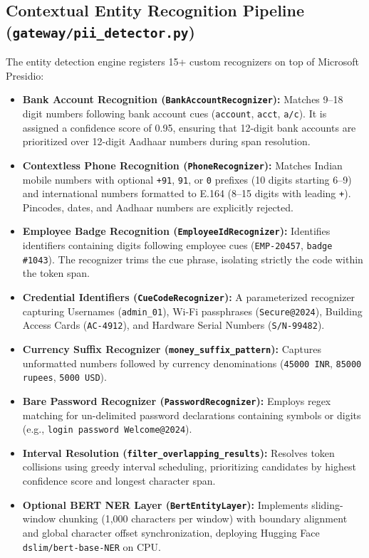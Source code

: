 \subsection{Contextual Entity Recognition Pipeline (\texttt{gateway/pii\_detector.py})}
The entity detection engine registers 15+ custom recognizers on top of Microsoft Presidio:
\begin{itemize}[leftmargin=*]
    \item \textbf{Bank Account Recognition (\texttt{BankAccountRecognizer}):} Matches 9--18 digit numbers following bank account cues (\texttt{account}, \texttt{acct}, \texttt{a/c}). It is assigned a confidence score of 0.95, ensuring that 12-digit bank accounts are prioritized over 12-digit Aadhaar numbers during span resolution.
    \item \textbf{Contextless Phone Recognition (\texttt{PhoneRecognizer}):} Matches Indian mobile numbers with optional \texttt{+91}, \texttt{91}, or \texttt{0} prefixes (10 digits starting 6--9) and international numbers formatted to E.164 (8--15 digits with leading \texttt{+}). Pincodes, dates, and Aadhaar numbers are explicitly rejected.
    \item \textbf{Employee Badge Recognition (\texttt{EmployeeIdRecognizer}):} Identifies identifiers containing digits following employee cues (\texttt{EMP-20457}, \texttt{badge \#1043}). The recognizer trims the cue phrase, isolating strictly the code within the token span.
    \item \textbf{Credential Identifiers (\texttt{CueCodeRecognizer}):} A parameterized recognizer capturing Usernames (\texttt{admin\_01}), Wi-Fi passphrases (\texttt{Secure@2024}), Building Access Cards (\texttt{AC-4912}), and Hardware Serial Numbers (\texttt{S/N-99482}).
    \item \textbf{Currency Suffix Recognizer (\texttt{money\_suffix\_pattern}):} Captures unformatted numbers followed by currency denominations (\texttt{45000 INR}, \texttt{85000 rupees}, \texttt{5000 USD}).
    \item \textbf{Bare Password Recognizer (\texttt{PasswordRecognizer}):} Employs regex matching for un-delimited password declarations containing symbols or digits (e.g., \texttt{login password Welcome@2024}).
    \item \textbf{Interval Resolution (\texttt{filter\_overlapping\_results}):} Resolves token collisions using greedy interval scheduling, prioritizing candidates by highest confidence score and longest character span.
    \item \textbf{Optional BERT NER Layer (\texttt{BertEntityLayer}):} Implements sliding-window chunking (1,000 characters per window) with boundary alignment and global character offset synchronization, deploying Hugging Face \texttt{dslim/bert-base-NER} on CPU.
\end{itemize}


